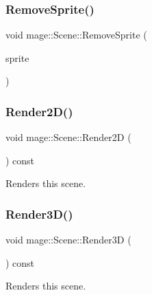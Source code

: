 \hypertarget{classmage_1_1_scene_a6d886d48157b9988ab61cc9b01ee752e}{}\label{classmage_1_1_scene_a6d886d48157b9988ab61cc9b01ee752e} 
\subsubsection{\texorpdfstring{Remove\+Sprite()}{RemoveSprite()}}
{\footnotesize\ttfamily void mage\+::\+Scene\+::\+Remove\+Sprite (\begin{DoxyParamCaption}\item[{\hyperlink{namespacemage_a1e01ae66713838a7a67d30e44c67703e}{Shared\+Ptr}$<$ \hyperlink{classmage_1_1_sprite_object}{Sprite\+Object} $>$}]{sprite }\end{DoxyParamCaption})}

\hypertarget{classmage_1_1_scene_a53487349d68f0ffcc91b243d0cfb86a3}{}\label{classmage_1_1_scene_a53487349d68f0ffcc91b243d0cfb86a3} 
\subsubsection{\texorpdfstring{Render2\+D()}{Render2D()}}
{\footnotesize\ttfamily void mage\+::\+Scene\+::\+Render2D (\begin{DoxyParamCaption}{ }\end{DoxyParamCaption}) const}

Renders this scene. \hypertarget{classmage_1_1_scene_a51d2d441067d30cf3a444d6a80811f93}{}\label{classmage_1_1_scene_a51d2d441067d30cf3a444d6a80811f93} 
\subsubsection{\texorpdfstring{Render3\+D()}{Render3D()}}
{\footnotesize\ttfamily void mage\+::\+Scene\+::\+Render3D (\begin{DoxyParamCaption}{ }\end{DoxyParamCaption}) const}

Renders this scene. \hypertarget{classmage_1_1_scene_a7568ec0884d04812af2f70990c8ec80d}{}\label{classmage_1_1_scene_a7568ec0884d04812af2f70990c8ec80d} 
